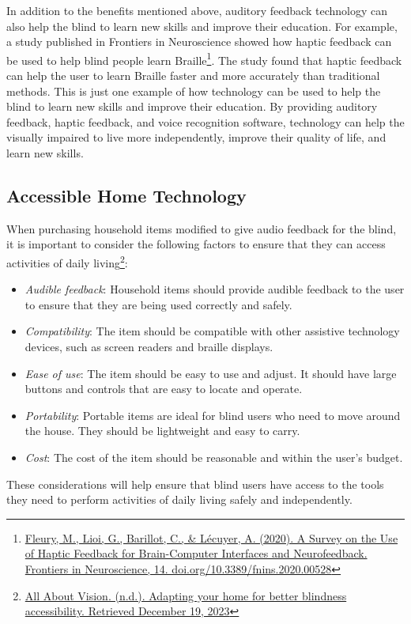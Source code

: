 In addition to the benefits mentioned above, auditory feedback technology can also help the blind to learn new skills and improve their education. For example, a study published in Frontiers in Neuroscience showed how haptic feedback can be used to help blind people learn Braille\footnote{\href{http://www.frontiersin.org/articles/10.3389/fnins.2020.00528/full}{Fleury, M., Lioi, G., Barillot, C., \& Lécuyer, A. (2020). A Survey on the Use of Haptic Feedback for Brain-Computer Interfaces and Neurofeedback. Frontiers in Neuroscience, 14. doi.org/10.3389/fnins.2020.00528}}. The study found that haptic feedback can help the user to learn Braille faster and more accurately than traditional methods. This is just one example of how technology can be used to help the blind to learn new skills and improve their education. By providing auditory feedback, haptic feedback, and voice recognition software, technology can help the visually impaired to live more independently, improve their quality of life, and learn new skills.

\subsection{Accessible Home Technology}\label{ind-living-tools}
When purchasing household items modified to give audio feedback for the blind, it is important to consider the following factors to ensure that they can access activities of daily living\footnote{\href{http://www.allaboutvision.com/resources/adapting-the-home-better-blindness-accessibility/}{All About Vision. (n.d.). Adapting your home for better blindness accessibility. Retrieved December 19, 2023}}:
\begin{itemize}
 \item \emph{Audible feedback}: Household items should provide audible feedback to the user to ensure that they are being used correctly and safely.
 \item \emph{Compatibility}: The item should be compatible with other assistive technology devices, such as screen readers and braille displays.
 \item \emph{Ease of use}: The item should be easy to use and adjust. It should have large buttons and controls that are easy to locate and operate.
 \item \emph{Portability}: Portable items are ideal for blind users who need to move around the house. They should be lightweight and easy to carry.
 \item \emph{Cost}: The cost of the item should be reasonable and within the user’s budget.
\end{itemize}
These considerations will help ensure that blind users have access to the tools they need to perform activities of daily living safely and independently.

